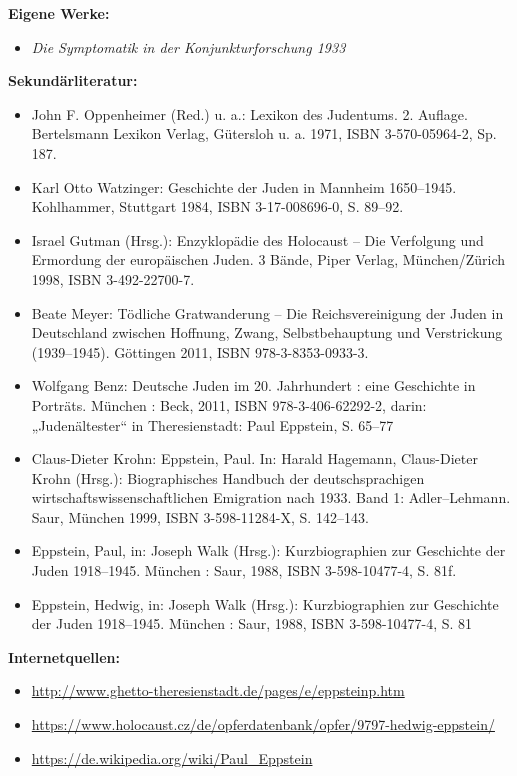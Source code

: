 \documentclass[a4paper]{article}
\begin{document}
\bigskip

\textbf{Eigene Werke:}

\begin{itemize}
\item \textit{Die Symptomatik in der Konjunkturforschung 1933}
\end{itemize}

\bigskip

\textbf{Sekundärliteratur:}

\begin{itemize}
\item John F. Oppenheimer (Red.) u. a.: Lexikon des Judentums. 2. Auflage. Bertelsmann Lexikon Verlag, Gütersloh u. a.
1971, ISBN 3-570-05964-2, Sp. 187.  
\item Karl Otto Watzinger: Geschichte der Juden in Mannheim 1650–1945. Kohlhammer, Stuttgart 1984, ISBN 3-17-008696-0,
S. 89–92.  
\item Israel Gutman (Hrsg.): Enzyklopädie des Holocaust – Die Verfolgung und Ermordung der europäischen Juden. 3 Bände,
Piper Verlag, München/Zürich 1998, ISBN 3-492-22700-7.  
\item Beate Meyer: Tödliche Gratwanderung – Die Reichsvereinigung der Juden in Deutschland zwischen Hoffnung, Zwang,
Selbstbehauptung und Verstrickung (1939–1945). Göttingen 2011, ISBN 978-3-8353-0933-3.  
\item Wolfgang Benz: Deutsche Juden im 20. Jahrhundert : eine Geschichte in Porträts. München : Beck, 2011, ISBN
978-3-406-62292-2, darin: „Judenältester“ in Theresienstadt: Paul Eppstein, S. 65–77  
\item Claus-Dieter Krohn: Eppstein, Paul. In: Harald Hagemann, Claus-Dieter Krohn (Hrsg.): Biographisches Handbuch der
deutschsprachigen wirtschaftswissenschaftlichen Emigration nach 1933. Band 1: Adler–Lehmann. Saur, München 1999, ISBN
3-598-11284-X, S. 142–143.  
\item Eppstein, Paul, in: Joseph Walk (Hrsg.): Kurzbiographien zur Geschichte der Juden 1918–1945. München : Saur, 1988,
ISBN 3-598-10477-4, S. 81f.  
\item Eppstein, Hedwig, in: Joseph Walk (Hrsg.): Kurzbiographien zur Geschichte der Juden 1918–1945. München : Saur,
1988, ISBN 3-598-10477-4, S. 81
\end{itemize}

\bigskip


\bigskip

\textbf{Internetquellen:}

\begin{itemize}
\item \url{http://www.ghetto-theresienstadt.de/pages/e/eppsteinp.htm}  
\item \url{https://www.holocaust.cz/de/opferdatenbank/opfer/9797-hedwig-eppstein/} 
\item \url{https://de.wikipedia.org/wiki/Paul_Eppstein} 
\end{itemize}
\end{document}
